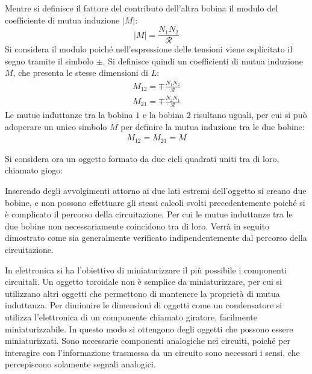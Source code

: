 \documentclass{article}
\numberwithin{equation}{subsection}
\begin{document}
Mentre si definisce il fattore del contributo dell'altra bobina il modulo del coefficiente di mutua induzione $|M|$:
\begin{equation}
    |M|=\displaystyle\frac{N_1 N_2}{\mathscr{R}}
\end{equation}
Si considera il modulo poiché nell'espressione delle tensioni viene esplicitato il segno tramite il simbolo $\pm$. Si definisce quindi un coefficienti di mutua induzione $M$, 
che presenta le stesse dimensioni di $L$:
\begin{gather*}
    M_{12}=\mp\displaystyle\frac{N_1 N_2}{\mathscr{R}}\\
    M_{21}=\mp\displaystyle\frac{N_2 N_1}{\mathscr{R}}
\end{gather*}
Le mutue induttanze tra la bobina $1$ e la bobina $2$ risultano uguali, per cui si può adoperare un unico simbolo $M$ per definire la mutua induzione tra le due bobine:
\begin{gather*}
    M_{12}=M_{21}=M
\end{gather*}

Si considera ora un oggetto formato da due cicli quadrati uniti tra di loro, chiamato giogo:
\begin{center}
\end{center}

Inserendo degli avvolgimenti attorno ai due lati estremi dell'oggetto si creano due bobine, e non possono effettuare gli stessi calcoli svolti precedentemente poiché si è 
complicato il percorso della circuitazione. Per cui le mutue induttanze tra le due bobine non necessariamente coincidono tra di loro. Verrà in seguito dimostrato come sia 
generalmente verificato indipendentemente dal percorso della circuitazione. 


In elettronica si ha l'obiettivo di miniaturizzare il più possibile i componenti circuitali. Un oggetto toroidale non è semplice da miniaturizzare, per cui si utilizzano 
altri oggetti che permettono di mantenere la proprietà di mutua induttanza. 
Per diminuire le dimensioni di oggetti come un condensatore si utilizza l'elettronica di un componente chiamato giratore, facilmente miniaturizzabile. In questo modo si 
ottengono degli oggetti che possono essere miniaturizzati. 
Sono necessarie componenti analogiche nei circuiti, poiché per interagire con l'informazione trasmessa da un circuito sono necessari i sensi, che percepiscono solamente 
segnali analogici. 
\end{document}
